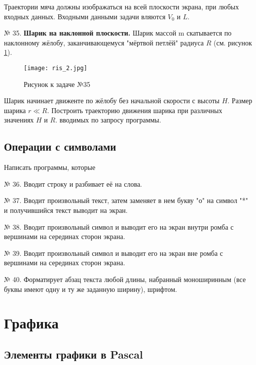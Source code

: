 Траектории мяча должны изображаться на всей плоскости экрана, при любых входных данных. Входными данными задачи  вляются  $V_0$ и $L$.

№ 35. {\bf Шарик на наклонной плоскости.}
Шарик массой m скатывается по наклонному жёлобу, заканчивающемуся "мёртвой петлёй" радиуса $R$ (см. рисунок \ref{ris2}). 
\begin{figure}[!hb]
\centerline{
\texttt{[image: ris\_2.jpg]}}
\caption{Рисунок к задаче №35}
\label{ris2}
\end{figure}
Шарик начинает движенте по жёлобу без начальной скорости с высоты $H$. Размер шарика $r \ll R$. Построить траекторию движения шарика при различных значениях $H$ и $R$. вводимых по запросу программы.

\subsection{Операции с символами}

Написать программы, которые

№ 36. Вводит строку и разбивает её на слова.

№ 37. Вводит произвольный текст, затем заменяет в нем букву "о" на   символ "*" и получившийся текст выводит на экран.

№ 38. Вводит произвольный символ и выводит его на экран внутри ромба с вершинами на серединах сторон экрана.

№ 39. Вводит произвольный символ и выводит его на экран вне ромба с вершинами на серединах сторон экрана.

№ 40. Форматирует абзац текста любой длины, набранный моноширинным (все буквы имеют одну и ту же заданную ширину), шрифтом.

\section{Графика}

\subsection{Элементы графики в Pascal}

